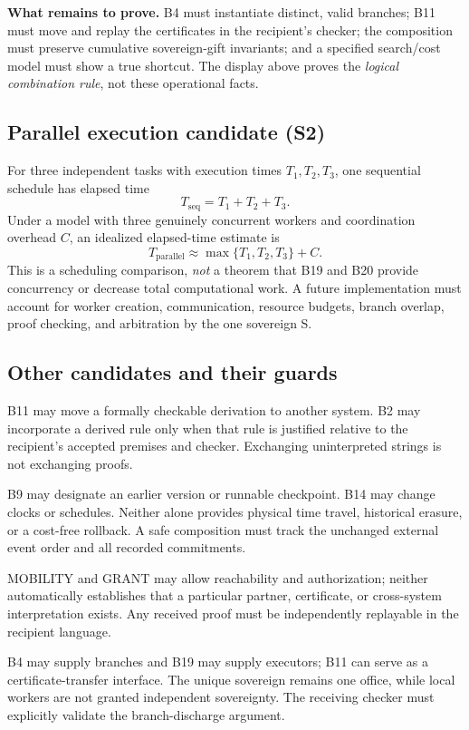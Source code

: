 \documentclass[11pt,letterpaper]{article}
\theoremstyle{definition}\newtheorem{definition}[theorem]{Definition}\newtheorem{example}[theorem]{Example}
\theoremstyle{remark}\newtheorem{remark}[theorem]{Remark}
\begin{document}
\textbf{What remains to prove.} B4 must instantiate distinct, valid branches; B11 must move and replay the certificates in the recipient's checker; the composition must preserve cumulative sovereign-gift invariants; and a specified search/cost model must show a true shortcut. The display above proves the \emph{logical combination rule}, not these operational facts.

\subsection*{Parallel execution candidate (S2)}
For three independent tasks with execution times \(T_1,T_2,T_3\), one sequential schedule has elapsed time
\[
 T_{\mathrm{seq}}=T_1+T_2+T_3.
\]
Under a model with three genuinely concurrent workers and coordination overhead \(C\), an idealized elapsed-time estimate is
\[
 T_{\mathrm{parallel}}\approx\max\{T_1,T_2,T_3\}+C.
\]
This is a scheduling comparison, \emph{not} a theorem that B19 and B20 provide concurrency or decrease total computational work. A future implementation must account for worker creation, communication, resource budgets, branch overlap, proof checking, and arbitration by the one sovereign S.

\subsection*{Other candidates and their guards}
\begin{description}[leftmargin=0.12in,style=nextline]
\item[S3 --- Conservative rule reuse.] B11 may move a formally checkable derivation to another system. B2 may incorporate a derived rule only when that rule is justified relative to the recipient's accepted premises and checker. Exchanging uninterpreted strings is not exchanging proofs.
\item[S4 --- Checkpoint restoration.] B9 may designate an earlier version or runnable checkpoint. B14 may change clocks or schedules. Neither alone provides physical time travel, historical erasure, or a cost-free rollback. A safe composition must track the unchanged external event order and all recorded commitments.
\item[S5 --- Access and trade.] MOBILITY and GRANT may allow reachability and authorization; neither automatically establishes that a particular partner, certificate, or cross-system interpretation exists. Any received proof must be independently replayable in the recipient language.
\item[S6 --- Scoped cooperative proof search.] B4 may supply branches and B19 may supply executors; B11 can serve as a certificate-transfer interface. The unique sovereign remains one office, while local workers are not granted independent sovereignty. The receiving checker must explicitly validate the branch-discharge argument.
\end{description}
\end{document}

